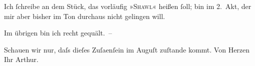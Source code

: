 \pstart
           Ich ſchreibe an dem Stück, das vorläufig »\textsc{Shawl}« heißen ſoll; bin im 2. Akt, {\pb}der mir aber bisher
               im Ton durchaus nicht gelingen will.\pend
           
\pstart
           Im übrigen bin ich recht gequält. –\pend
           
\pstart
           Schauen wir nur, daſs dieſes Zuſa{\geminationm}enſein im
                  Auguſt zuſtande kommt.\pend
           \pstart Von Herzen Ihr \spacefill\mbox{Arthur.}\pend{}\endnumbering{}  
      